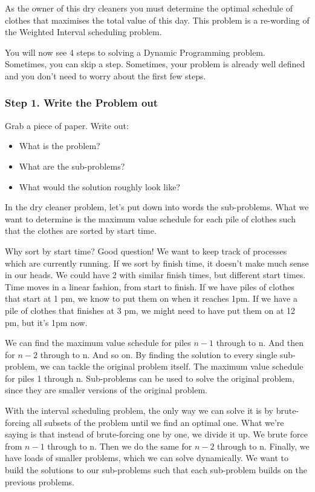 \documentclass{article}
\begin{document}
As the owner of this dry cleaners you must determine the optimal schedule of clothes that maximises the total value of this day. This problem is a re-wording of the Weighted Interval scheduling problem. 

You will now see 4 steps to solving a Dynamic Programming problem. Sometimes, you can skip a step. Sometimes, your problem is already well defined and you don't need to worry about the first few steps.

\subsubsection{Step 1. Write the Problem out}
Grab a piece of paper. Write out:
\begin{itemize}
    \item What is the problem?
    \item What are the sub-problems?
    \item What would the solution roughly look like?
\end{itemize}

In the dry cleaner problem, let's put down into words the sub-problems. What we want to determine is the maximum value schedule for each pile of clothes such that the clothes are sorted by start time.

Why sort by start time? Good question! We want to keep track of processes which are currently running. If we sort by finish time, it doesn't make much sense in our heads. We could have 2 with similar finish times, but different start times. Time moves in a linear fashion, from start to finish. If we have piles of clothes that start at 1 pm, we know to put them on when it reaches 1pm. If we have a pile of clothes that finishes at 3 pm, we might need to have put them on at 12 pm, but it's  1pm now. 

We can find the maximum value schedule for piles $n - 1$ through to n. And then for $n - 2$ through to n. And so on. By finding the solution to every single sub-problem, we can tackle the original problem itself. The maximum value schedule for piles 1 through n. Sub-problems can be used to solve the original problem, since they are smaller versions of the original problem.

With the interval scheduling problem, the only way we can solve it is by brute-forcing all subsets of the problem until we find an optimal one. What we're saying is that instead of brute-forcing one by one, we divide it up. We brute force from $n-1$ through to n. Then we do the same for $n - 2$ through to n. Finally, we have loads of smaller problems, which we can solve dynamically. We want to build the solutions to our sub-problems such that each sub-problem builds on the previous problems.
\newpage
\end{document}
